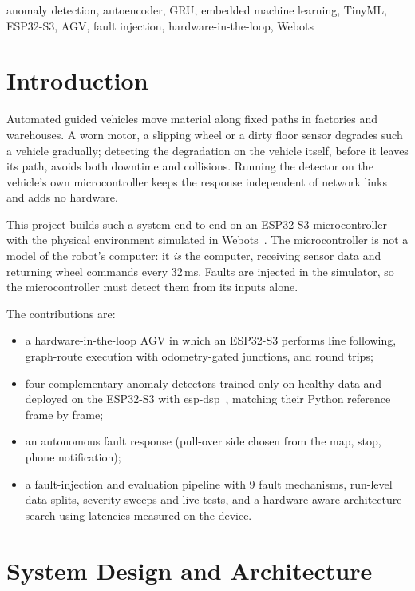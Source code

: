 \documentclass[conference]{IEEEtran}
\begin{document}
\begin{IEEEkeywords}
anomaly detection, autoencoder, GRU, embedded machine learning, TinyML,
ESP32-S3, AGV, fault injection, hardware-in-the-loop, Webots
\end{IEEEkeywords}

\section{Introduction}
Automated guided vehicles move material along fixed paths in factories and
warehouses. A worn motor, a slipping wheel or a dirty floor sensor degrades such
a vehicle gradually; detecting the degradation on the vehicle itself, before it
leaves its path, avoids both downtime and collisions. Running the detector on the
vehicle's own microcontroller keeps the response independent of network links
and adds no hardware.

This project builds such a system end to end on an ESP32-S3
microcontroller~\cite{esp32s3} with the physical environment simulated in
Webots~\cite{webots}. The microcontroller is not a model of the robot's
computer: it \emph{is} the computer, receiving sensor data and returning wheel
commands every 32\,ms. Faults are injected in the simulator, so the
microcontroller must detect them from its inputs alone.

The contributions are:
\begin{itemize}
\item a hardware-in-the-loop AGV in which an ESP32-S3 performs line following,
  graph-route execution with odometry-gated junctions, and round trips;
\item four complementary anomaly detectors trained only on healthy data and
  deployed on the ESP32-S3 with esp-dsp~\cite{espdsp}, matching their Python
  reference frame by frame;
\item an autonomous fault response (pull-over side chosen from the map, stop,
  phone notification);
\item a fault-injection and evaluation pipeline with 9 fault mechanisms, run-level
  data splits, severity sweeps and live tests, and a hardware-aware architecture
  search using latencies measured on the device.
\end{itemize}

\section{System Design and Architecture}
\end{document}
